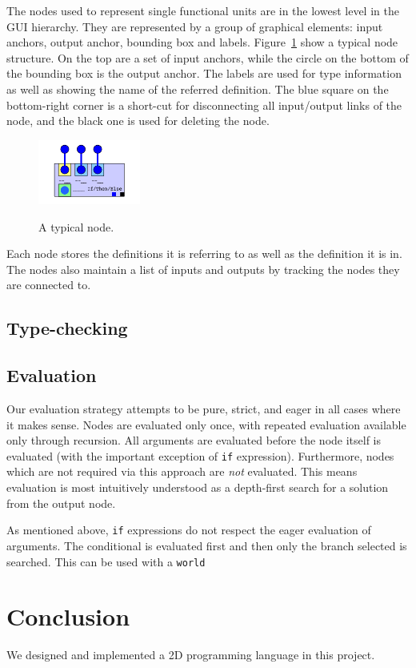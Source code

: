 \documentclass[12pt,UTF8,a4]{article}
\newcommand{\code}[1]{\texttt{#1}}
\begin{document}
The nodes used to represent single functional units are in the lowest level in the GUI hierarchy. They are represented by a group of graphical elements: input anchors, output anchor, bounding box and labels. Figure~\ref{fig:node} show a typical node structure. On the top are a set of input anchors, while the circle on the bottom of the bounding box is the output anchor. The labels are used for type information as well as showing the name of the referred definition. The blue square on the bottom-right corner is a short-cut for disconnecting all input/output links of the node, and the black one is used for deleting the node.
\begin{figure}[h]
\center
\includegraphics[width=0.3\textwidth]{./images/node} \\
\caption{A typical node.}\label{fig:node}
\end{figure}

Each node stores the definitions it is referring to as well as the definition it is in. The nodes also maintain a list of inputs and outputs by tracking the nodes they are connected to.

\subsection{Type-checking}
\subsection{Evaluation}
Our evaluation strategy attempts to be pure, strict, and eager in all cases where it makes sense. Nodes are evaluated only once, with repeated evaluation available only through recursion. All arguments are evaluated before the node itself is evaluated (with the important exception of \code{if} expression). Furthermore, nodes which are not required via this approach are {\em not} evaluated. This means evaluation is most intuitively understood as a depth-first search for a solution from the output node.

As mentioned above, \code{if} expressions do not respect the eager evaluation of arguments. The conditional is evaluated first and then only the branch selected is searched. This can be used with a \code{world}

\section{Conclusion}
We designed and implemented a 2D programming language in this project. 
\end{document}
